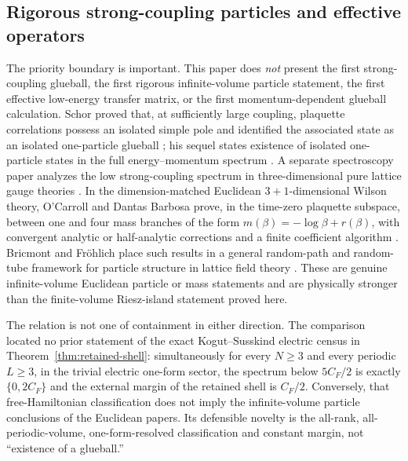 \documentclass[11pt]{article}
\theoremstyle{plain}
\theoremstyle{definition}
\theoremstyle{remark}
\newcommand{\CF}{C_F}
\begin{document}
\subsection{Rigorous strong-coupling particles and effective operators}
\label{sec:rigorous-related-work}

The priority boundary is important.  This paper does \emph{not} present the
first strong-coupling glueball, the first rigorous infinite-volume particle
statement, the first effective low-energy transfer matrix, or the first
momentum-dependent glueball calculation.  Schor proved that, at sufficiently
large coupling, plaquette correlations possess an isolated simple pole and
identified the associated state as an isolated one-particle glueball
\cite{Schor1983Existence}; his sequel states existence of isolated
one-particle states in the full energy--momentum spectrum
\cite{Schor1984EnergyMomentum}.  A separate spectroscopy paper analyzes the
low strong-coupling spectrum in three-dimensional pure lattice gauge theories
\cite{Schor1984Spectroscopy}.  In the dimension-matched Euclidean
$3{+}1$-dimensional Wilson theory, O'Carroll and Dantas Barbosa prove, in the
time-zero plaquette subspace, between one and four mass branches of the form
$m(\beta)=-\log\beta+r(\beta)$, with convergent analytic or half-analytic
corrections and a finite coefficient algorithm \cite{OCarrollBarbosa1985}.
Bricmont and Fr\"ohlich place such results in a general random-path and
random-tube framework for particle structure in lattice field theory
\cite{BricmontFrohlich1985General}.  These are genuine infinite-volume
Euclidean particle or mass statements and are physically stronger than the
finite-volume Riesz-island statement proved here.

The relation is not one of containment in either direction.  The comparison
located no prior statement of the exact Kogut--Susskind electric census in
Theorem~\ref{thm:retained-shell}: simultaneously for every $N\ge3$ and every
periodic $L\ge3$, in the trivial electric one-form sector, the spectrum below
$5\CF/2$ is exactly $\{0,2\CF\}$ and the external margin of the retained shell
is $\CF/2$.  Conversely, that free-Hamiltonian classification does not imply
the infinite-volume particle conclusions of the Euclidean papers.  Its
defensible novelty is the all-rank, all-periodic-volume, one-form-resolved
classification and constant margin, not ``existence of a glueball.''
\end{document}
